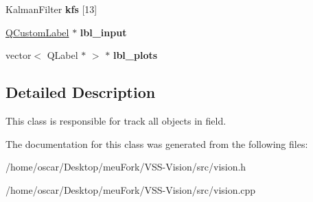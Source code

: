 \begin{DoxyCompactItemize}
\item 
\hypertarget{classvision_a76bf5d0bd645d4db2d9535bacae1284f}{Kalman\-Filter {\bfseries kfs} \mbox{[}13\mbox{]}}\label{classvision_a76bf5d0bd645d4db2d9535bacae1284f}

\item 
\hypertarget{classvision_ae925689fd0bd2eb2fcf2159e2f7b251e}{\hyperlink{classQCustomLabel}{Q\-Custom\-Label} $\ast$ {\bfseries lbl\-\_\-input}}\label{classvision_ae925689fd0bd2eb2fcf2159e2f7b251e}

\item 
\hypertarget{classvision_a4ec174995015376fcc9c15add83ed422}{vector$<$ Q\-Label $\ast$ $>$ $\ast$ {\bfseries lbl\-\_\-plots}}\label{classvision_a4ec174995015376fcc9c15add83ed422}

\end{DoxyCompactItemize}


\subsection{Detailed Description}
This class is responsible for track all objects in field. 

The documentation for this class was generated from the following files\-:\begin{DoxyCompactItemize}
\item 
/home/oscar/\-Desktop/meu\-Fork/\-V\-S\-S-\/\-Vision/src/vision.\-h\item 
/home/oscar/\-Desktop/meu\-Fork/\-V\-S\-S-\/\-Vision/src/vision.\-cpp\end{DoxyCompactItemize}
